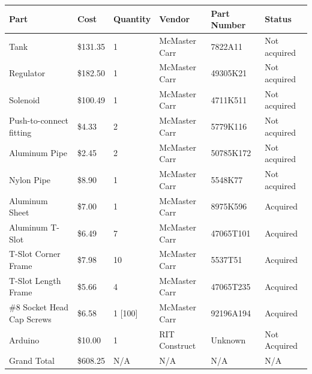 \documentclass[conference]{IEEEtran} %
\begin{document}
\centering
\begin{tabular}{ |p{4cm}||p{1.0cm}|p{1.5cm}|p{2.5cm}|p{2.0cm}|p{2.0cm}| }
  \hline
  Part & Cost & Quantity & Vendor & Part Number & Status \\
  \hline
  Tank & \$131.35 & 1 & McMaster Carr & 7822A11 & Not acquired \\
  \hline
  Regulator & \$182.50 & 1 & McMaster Carr & 49305K21 & Not acquired \\
  \hline
  Solenoid & \$100.49 & 1 & McMaster Carr & 4711K511 & Not acquired \\
  \hline
  Push-to-connect fitting & \$4.33 & 2 & McMaster Carr & 5779K116 & Not acquired \\
  \hline
  Aluminum Pipe & \$2.45 & 2 & McMaster Carr & 50785K172 & Not acquired \\
  \hline
  Nylon Pipe & \$8.90 & 1 & McMaster Carr & 5548K77 & Not acquired \\
  \hline
  Aluminum Sheet & \$7.00 & 1 & McMaster Carr & 8975K596 & Acquired \\
  \hline
  Aluminum T-Slot & \$6.49 & 7 & McMaster Carr & 47065T101 & Acquired \\
  \hline
  T-Slot Corner Frame & \$7.98 & 10 & McMaster Carr & 5537T51 & Acquired \\
  \hline
  T-Slot Length Frame & \$5.66 & 4 & McMaster Carr & 47065T235 & Acquired \\
  \hline
  \#8 Socket Head Cap Screws & \$6.58 & 1 [100] & McMaster Carr & 92196A194 & Acquired \\
  \hline
  Arduino & \$10.00 & 1 & RIT Construct & Unknown & Not Acquired \\
  \hline
  Grand Total & \$608.25 & N/A & N/A & N/A & N/A \\
  \hline
\end{tabular}


\printbibliography
\end{document}
